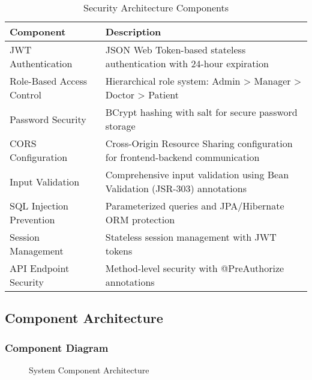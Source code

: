 \documentclass[12pt,a4paper]{article}
\begin{document}
\begin{table}[H]
\centering
\caption{Security Architecture Components}
\label{tab:security-architecture}
\begin{tabularx}{\textwidth}{|l|X|}
\hline
\textbf{Component} & \textbf{Description} \\
\hline
JWT Authentication & JSON Web Token-based stateless authentication with 24-hour expiration \\
\hline
Role-Based Access Control & Hierarchical role system: Admin > Manager > Doctor > Patient \\
\hline
Password Security & BCrypt hashing with salt for secure password storage \\
\hline
CORS Configuration & Cross-Origin Resource Sharing configuration for frontend-backend communication \\
\hline
Input Validation & Comprehensive input validation using Bean Validation (JSR-303) annotations \\
\hline
SQL Injection Prevention & Parameterized queries and JPA/Hibernate ORM protection \\
\hline
Session Management & Stateless session management with JWT tokens \\
\hline
API Endpoint Security & Method-level security with @PreAuthorize annotations \\
\hline
\end{tabularx}
\end{table}

\subsection{Component Architecture}

\subsubsection{Component Diagram}

\begin{figure}[H]
\centering
{}
\caption{System Component Architecture}
\label{fig:component-diagram}
\end{figure}
\end{document}
